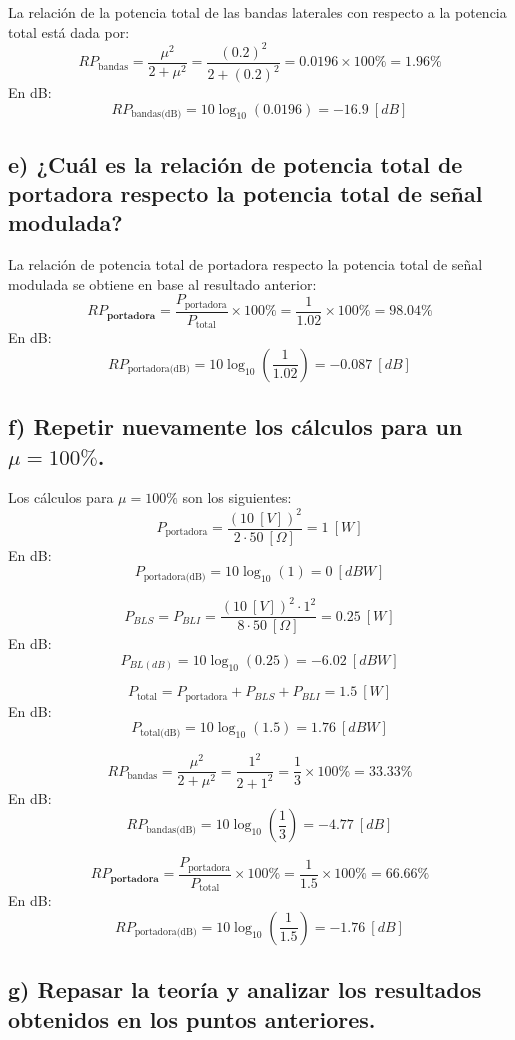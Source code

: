 La relación de la potencia total de las bandas laterales con respecto a la potencia total está dada por:
\[
    RP_{\text{bandas}} = \frac{\mu^2}{2 + \mu^2} = \frac{(0.2)^2}{2 + (0.2)^2} = 0.0196 \times 100\% = 1.96\%
\]
En dB:
\[
    RP_{\text{bandas(dB)}} = 10 \log_{10}(0.0196) = -16.9~[dB]
\]

\subsection*{e) ¿Cuál es la relación de potencia total de portadora respecto la potencia total de señal modulada?}

La relación de potencia total de portadora respecto la potencia total de señal modulada se obtiene en base al resultado anterior:
\[
    RP_\textbf{portadora}=\frac{P_\text{portadora}}{P_{\text{total}}} \times 100\% = \frac{1}{1.02} \times 100\% = 98.04\%
\]
En dB:
\[
    RP_{\text{portadora(dB)}} = 10 \log_{10}\left(\frac{1}{1.02}\right) = -0.087~[dB]
\]

\subsection*{f) Repetir nuevamente los cálculos para un $\mu = 100\%$.}

Los cálculos para $\mu = 100\%$ son los siguientes:
\[
    P_{\text{portadora}} = \frac{(10~[V])^2}{2 \cdot 50~[\Omega]} = 1~[W]
\]
En dB:
\[
    P_{\text{portadora(dB)}} = 10 \log_{10}(1) = 0~[dBW]
\]

\[
    P_{BLS} = P_{BLI} = \frac{(10~[V])^2 \cdot 1^2}{8 \cdot 50~[\Omega]} = 0.25~[W]
\]
En dB:
\[
    P_{BL(dB)} = 10 \log_{10}(0.25) = -6.02~[dBW]
\]

\[
    P_{\text{total}} = P_{\text{portadora}} + P_{BLS} + P_{BLI} = 1.5~[W]
\]
En dB:
\[
    P_{\text{total(dB)}} = 10 \log_{10}(1.5) = 1.76~[dBW]
\]

\[
    RP_{\text{bandas}} = \frac{\mu^2}{2 + \mu^2} = \frac{1^2}{2 + 1^2} = \frac{1}{3} \times 100\% = 33.33\%
\]
En dB:
\[
    RP_{\text{bandas(dB)}} = 10 \log_{10}\left(\frac{1}{3}\right) = -4.77~[dB]
\]

\[
    RP_\textbf{portadora}=\frac{P_\text{portadora}}{P_{\text{total}}} \times 100\% = \frac{1}{1.5} \times 100\% = 66.66\%
\]
En dB:
\[
    RP_{\text{portadora(dB)}} = 10 \log_{10}\left(\frac{1}{1.5}\right) = -1.76~[dB]
\]


\subsection*{g) Repasar la teoría y analizar los resultados obtenidos en los puntos anteriores.}

